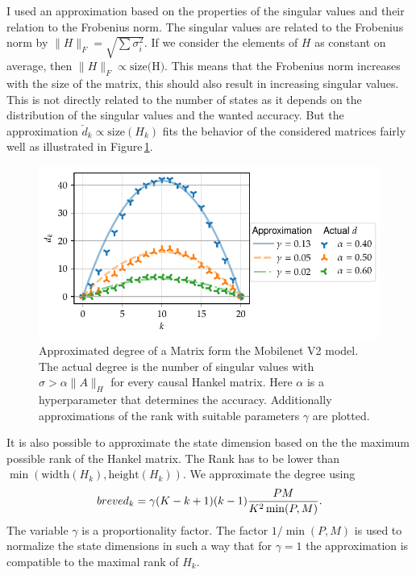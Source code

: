 \documentclass[doctype=mastersthesis,BCOR=15mm,biblatex]{ldvbook}%
\begin{document}
I used an approximation based on the properties of the singular values and their relation to the Frobenius norm.
The singular values are related to the Frobenius norm by $\|H\|_F = \sqrt{\sum \sigma_i^2}$.
If we consider the elements of $H$ as constant on average, then $\|H\|_F \propto \text{size(H)}$.
This means that the Frobenius norm increases with the size of the matrix, this should also result in increasing singular values.
This is not directly related to the number of states as it depends on the distribution of the singular values and the wanted accuracy.
But the approximation $\breve{d}_k \propto \text{size}(H_k)$ fits the behavior of the considered matrices fairly well as illustrated in Figure\,\ref{fig:approx_degree}.
\begin{figure}[htb]
	\centering
	\includegraphics[width=\textwidth]{Plots/approx_degree.pdf}
	\caption{Approximated degree of a Matrix form the Mobilenet V2 model.
	The actual degree is the number of singular values with $\sigma > \alpha \|A\|_H$ for every causal Hankel matrix. Here $\alpha$ is a hyperparameter that determines the accuracy.
	Additionally approximations of the rank with suitable parameters $\gamma$ are plotted.}
	\label{fig:approx_degree}
\end{figure}
It is also possible to approximate the state dimension based on the the maximum possible rank of the Hankel matrix.
The Rank has to be lower than $\min(\text{width}(H_k),\text{height}(H_k))$.
We approximate the degree using
\begin{equation}\label{eq:approx_d}
	\\breve{d}_k = \gamma (K-k+1)(k-1)\frac{PM}{K^2\min(P,M)}.
\end{equation}
The variable $\gamma$ is a proportionality factor.
The factor $1/\min(P,M)$ is used to normalize the state dimensions in such a way that for $\gamma = 1$ the approximation is compatible to the maximal rank of $H_k$. 
\end{document}
